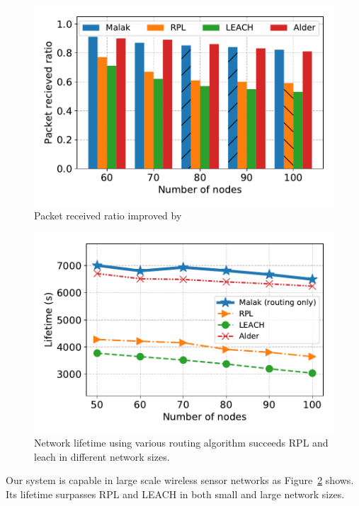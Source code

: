 \begin{figure}[htbp]
	\centering
	\includegraphics[width=.95\columnwidth]{Figure/packet_loss_ratio_with_size}
	\vspace{-0.1in}
	\caption{Packet received ratio improved by {\sdn}}
	\label{fig:packet_loss_ratio_with_size}
\end{figure}



\begin{figure}[htbp]
	\centering
	\includegraphics[width=.95\columnwidth]{Figure/lifetime}
	\vspace{-0.1in}
	\caption{Network lifetime using various routing algorithm
		\textnormal{
			{\sdn} succeeds RPL and leach in different network sizes.
		}}
	\label{fig:lifetime}
\end{figure}

Our {\sdn} system is capable in large scale wireless sensor networks as
Figure~\ref{fig:lifetime} shows. Its lifetime surpasses RPL and LEACH in both
small and large network sizes.

